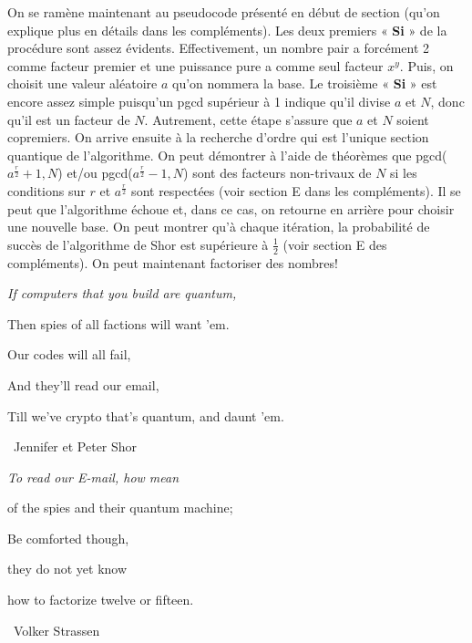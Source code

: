 On se ramène maintenant au pseudocode présenté en début de section (qu'on explique plus en détails dans les compléments). Les deux premiers « \textbf{Si} » de la procédure sont assez évidents. Effectivement, un nombre pair a forcément 2 comme facteur premier et une puissance pure a comme seul facteur $x^y$. Puis, on choisit une valeur aléatoire $a$ qu'on nommera la base. Le troisième « \textbf{Si} » est encore assez simple puisqu'un pgcd supérieur à 1 indique qu'il divise $a$ et $N$, donc qu'il est un facteur de $N$. Autrement, cette étape s'assure que $a$ et $N$ soient copremiers. On arrive ensuite à la recherche d'ordre qui est l'unique section quantique de l'algorithme. On peut démontrer à l'aide de théorèmes que pgcd($a^{\frac{r}{2}} + 1, N$) et/ou pgcd($a^{\frac{r}{2}} - 1, N$) sont des facteurs non-trivaux de $N$ si les conditions sur $r$ et $a^{\frac{r}{2}}$ sont respectées (voir section E dans les compléments). Il se peut que l'algorithme échoue et, dans ce cas, on retourne en arrière pour choisir une nouvelle base. On peut montrer qu'à chaque itération, la probabilité de succès de l'algorithme de Shor est supérieure à $\frac{1}{2}$ (voir section E des compléments). On peut maintenant factoriser des nombres!

\vspace{3em}
\begin{center}
        \itshape
        If computers that you build are quantum,
    
        Then spies of all factions will want 'em.
    
        Our codes will all fail,
    
        And they'll read our email,
        
        Till we've crypto that's quantum, and daunt 'em.

    \vspace{0.5em}
    \normalfont
    \textemdash\ Jennifer et Peter Shor
\end{center}

\vspace{2em}
\begin{center}
        \itshape
        To read our E-mail, how mean

        of the spies and their quantum machine;

        Be comforted though,

        they do not yet know

        how to factorize twelve or fifteen.

    \vspace{0.5em}
    \normalfont
    \textemdash\ Volker Strassen
\end{center}